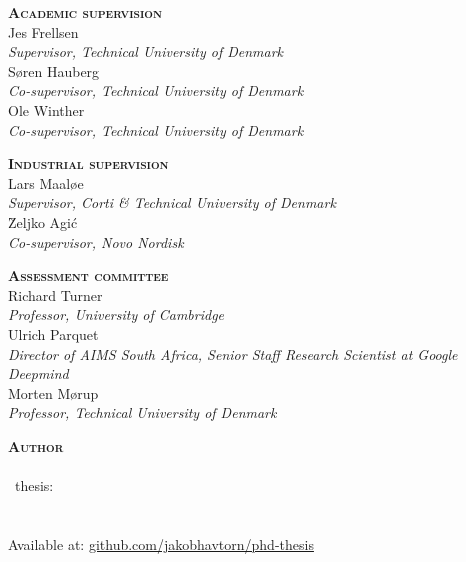 

\thispagestyle{empty} %

\hfill\vfill

\noindent
\small%
\textsc{\textbf{Academic supervision}}
\medskip
\\Jes Frellsen\\
\textit{Supervisor, Technical University of Denmark}
\medskip
\\Søren Hauberg\\
\textit{Co-supervisor, Technical University of Denmark}
\medskip
\\Ole Winther\\
\textit{Co-supervisor, Technical University of Denmark}
\medskip

\bigskip
\noindent
\textsc{\textbf{Industrial supervision}}
\medskip
\\Lars Maaløe\\
\textit{Supervisor, Corti \& Technical University of Denmark}
\medskip
\\\u{Z}eljko Agi\'c\\
\textit{Co-supervisor, Novo Nordisk}
\medskip

\bigskip
\noindent
\textsc{\textbf{Assessment committee}}
\medskip
\\Richard Turner\\
\textit{Professor, University of Cambridge}
\medskip
\\Ulrich Parquet\\
\textit{Director of AIMS South Africa, Senior Staff Research Scientist at Google Deepmind}
\medskip
\\Morten Mørup\\
\textit{Professor, Technical University of Denmark} %
\medskip

\bigskip
\noindent
\textsc{\textbf{Author}}
\medskip
\\\thesisauthor\\
\thesistypeabbr\ thesis:\\
\textit{\thesistitle}\\
\textcopyright\ \thesismonth\ \thesisyear\\
Available at: \href{https://github.com/JakobHavtorn/phd-thesis}{github.com/jakobhavtorn/phd-thesis}

\normalsize
\normalfont
